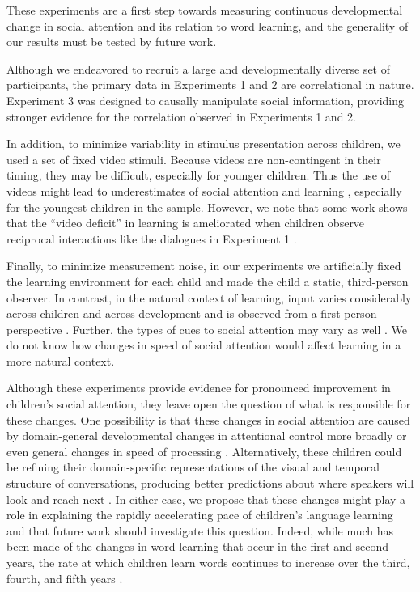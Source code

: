 \documentclass[jou,floatsintext]{apa6}
\begin{document}
These experiments are a first step towards measuring continuous developmental change in social attention and its relation to word learning, and the generality of our results must be tested by future work.

Although we endeavored to recruit a large and developmentally diverse set of participants, the primary data in Experiments 1 and 2 are correlational in nature. Experiment 3 was designed to causally manipulate social information, providing stronger evidence for the correlation observed in Experiments 1 and 2.

In addition, to minimize variability in stimulus presentation across children, we used a set of fixed video stimuli. Because videos are non-contingent in their timing, they may be difficult, especially for younger children. Thus the use of videos might lead to underestimates of social attention and learning \cite{anderson2005}, especially for the youngest children in the sample. However, we note that some work shows that the ``video deficit'' in learning is ameliorated when children observe reciprocal interactions like the dialogues in Experiment 1 \cite{odoherty2011}.

Finally, to minimize measurement noise, in our experiments we artificially fixed the learning environment for each child and made the child a static, third-person observer. In contrast, in the natural context of learning, input varies considerably across children and across development and is observed from a first-person perspective \cite{yu2013}. Further, the types of cues to social attention may vary as well \cite{franchak2018,kretch2014}. We do not know how changes in speed of social attention would affect learning in a more natural context.

Although these experiments provide evidence for pronounced improvement in children's social attention, they leave open the question of what is responsible for these changes. One possibility is that these changes in social attention are caused by domain-general developmental changes in attentional control more broadly \cite{rueda2005,smith2013} or even general changes in speed of processing \cite{kail1991}. Alternatively, these children could be refining their domain-specific representations of the visual and temporal structure of conversations, producing better predictions about where speakers will look and reach next \cite{acheson2009,krogh-jespersen2015}. In either case, we propose that these changes might play a role in explaining the rapidly accelerating pace of children's language learning and that future work should investigate this question. Indeed, while much has been made of the changes in word learning that occur in the first and second years, the rate at which children learn words continues to increase over the third, fourth, and fifth years \cite{bloom2000}.
\end{document}
